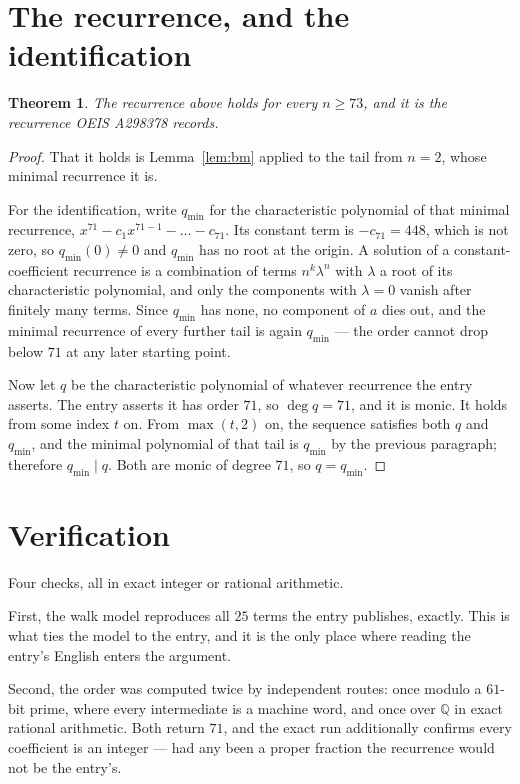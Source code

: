 \documentclass[11pt,a4paper]{article}
\theoremstyle{plain}
\newtheorem{theorem}{Theorem}
\theoremstyle{definition}
\begin{document}
\section{The recurrence, and the identification}

\begin{theorem}
The recurrence above holds for every $n\ge73$, and it is the recurrence OEIS A298378 records.
\end{theorem}

\begin{proof}
That it holds is Lemma~\ref{lem:bm} applied to the tail from $n=2$, whose minimal
recurrence it is.

For the identification, write $q_{\min}$ for the characteristic polynomial of that minimal
recurrence, $x^{71}-c_1x^{71-1}-\dots-c_{71}$. Its constant term is
$-c_{71}=448$, which is not zero, so $q_{\min}(0)\neq0$ and $q_{\min}$ has no
root at the origin. A solution of a constant-coefficient recurrence is a combination of terms
$n^{k}\lambda^{n}$ with $\lambda$ a root of its characteristic polynomial, and only the
components with $\lambda=0$ vanish after finitely many terms. Since $q_{\min}$ has none, no
component of $a$ dies out, and the minimal recurrence of every further tail is again
$q_{\min}$ --- the order cannot drop below $71$ at any later starting point.

Now let $q$ be the characteristic polynomial of whatever recurrence the entry asserts. The
entry asserts it has order $71$, so $\deg q=71$, and it is monic. It holds from some
index $t$ on. From $\max(t,2)$ on, the sequence satisfies both $q$ and $q_{\min}$, and
the minimal polynomial of that tail is $q_{\min}$ by the previous paragraph; therefore
$q_{\min}\mid q$. Both are monic of degree $71$, so $q=q_{\min}$.
\end{proof}

\section{Verification}

Four checks, all in exact integer or rational arithmetic.

First, the walk model reproduces all $25$ terms the entry publishes, exactly. This is
what ties the model to the entry, and it is the only place where reading the entry's English
enters the argument.

Second, the order was computed twice by independent routes: once modulo a $61$-bit prime, where
every intermediate is a machine word, and once over $\mathbb{Q}$ in exact rational arithmetic.
Both return $71$, and the exact run additionally confirms every coefficient is an integer
--- had any been a proper fraction the recurrence would not be the entry's.
\end{document}
